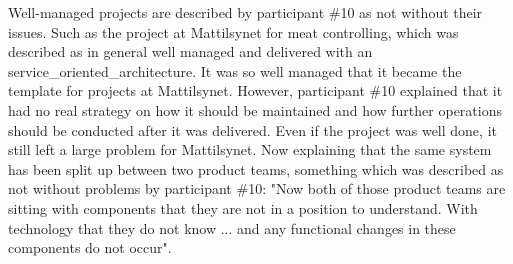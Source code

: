 
Well-managed projects are described by participant \#10 as not without their issues. Such as the project at Mattilsynet for meat controlling, which was described as in general well managed and delivered with an \gls{service_oriented_architecture}. It was so well managed that it became the template for projects at Mattilsynet. However, participant \#10 explained that it had no real strategy on how it should be maintained and how further operations should be conducted after it was delivered. Even if the project was well done, it still left a large problem for Mattilsynet. Now explaining that the same system has been split up between two product teams, something which was described as not without problems by participant \#10: "Now both of those product teams are sitting with components that they are not in a position to understand. With technology that they do not know ... and any functional changes in these components do not occur".



